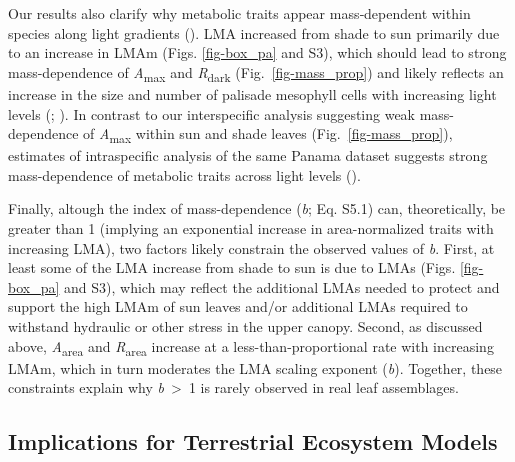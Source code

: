 \documentclass[
  12pt,
  letterpaper,
  DIV=11,
  numbers=noendperiod]{scrartcl}
\begin{document}
Our results also clarify why metabolic traits appear mass‐dependent
within species along light gradients (). LMA increased from shade to sun primarily due to an increase
in LMAm (Figs. \ref{fig-box_pa} and S3), which should lead to strong
mass-dependence of \emph{A}\textsubscript{max} and
\emph{R}\textsubscript{dark} (Fig.~\ref{fig-mass_prop}) and likely
reflects an increase in the size and number of palisade mesophyll cells
with increasing light levels (; ). In contrast
to our interspecific analysis suggesting weak mass-dependence of
\emph{A}\textsubscript{max} within sun and shade leaves
(Fig.~\ref{fig-mass_prop}), estimates of intraspecific analysis of the
same Panama dataset suggests strong mass-dependence of metabolic traits
across light levels ().

Finally, altough the index of mass-dependence (\emph{b}; Eq. S5.1) can,
theoretically, be greater than 1 (implying an exponential increase in
area-normalized traits with increasing LMA), two factors likely
constrain the observed values of \emph{b}. First, at least some of the
LMA increase from shade to sun is due to LMAs (Figs. \ref{fig-box_pa}
and S3), which may reflect the additional LMAs needed to protect and
support the high LMAm of sun leaves and/or additional LMAs required to
withstand hydraulic or other stress in the upper canopy. Second, as
discussed above, \emph{A}\textsubscript{area} and
\emph{R}\textsubscript{area} increase at a less-than-proportional rate
with increasing LMAm, which in turn moderates the LMA scaling exponent
(\emph{b}). Together, these constraints explain why
\emph{b}~\textgreater~1 is rarely observed in real leaf assemblages.

\subsection{Implications for Terrestrial Ecosystem
Models}\label{implications-for-terrestrial-ecosystem-models}
\end{document}
